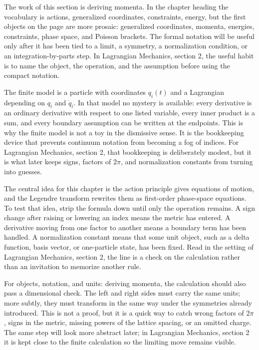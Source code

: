 The work of this section is deriving momenta.  In the chapter heading the vocabulary is actions, generalized coordinates, constraints, energy, but the first objects on the page are more prosaic: generalized coordinates, momenta, energies, constraints, phase space, and Poisson brackets.  The formal notation will be useful only after it has been tied to a limit, a symmetry, a normalization condition, or an integration-by-parts step.  In Lagrangian Mechanics, section 2, the useful habit is to name the object, the operation, and the assumption before using the compact notation.

The finite model is a particle with coordinates \(q_i(t)\) and a Lagrangian depending on \(q_i\) and \(\dot q_i\).  In that model no mystery is available: every derivative is an ordinary derivative with respect to one listed variable, every inner product is a sum, and every boundary assumption can be written at the endpoints.  This is why the finite model is not a toy in the dismissive sense.  It is the bookkeeping device that prevents continuum notation from becoming a fog of indices.  For Lagrangian Mechanics, section 2, that bookkeeping is deliberately modest, but it is what later keeps signs, factors of \(2\pi\), and normalization constants from turning into guesses.

The central idea for this chapter is the action principle gives equations of motion, and the Legendre transform rewrites them as first-order phase-space equations.  To test that idea, strip the formula down until only the operation remains.  A sign change after raising or lowering an index means the metric has entered.  A derivative moving from one factor to another means a boundary term has been handled.  A normalization constant means that some unit object, such as a delta function, basis vector, or one-particle state, has been fixed.  Read in the setting of Lagrangian Mechanics, section 2, the line is a check on the calculation rather than an invitation to memorize another rule.

For objects, notation, and units: deriving momenta, the calculation should also pass a dimensional check.  The left and right sides must carry the same units; more subtly, they must transform in the same way under the symmetries already introduced.  This is not a proof, but it is a quick way to catch wrong factors of \(2\pi\), signs in the metric, missing powers of the lattice spacing, or an omitted charge.  The same step will look more abstract later; in Lagrangian Mechanics, section 2 it is kept close to the finite calculation so the limiting move remains visible.

